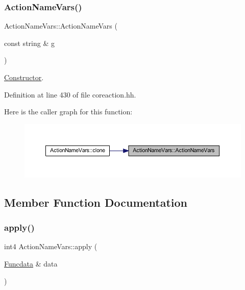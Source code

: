 \subsubsection{\texorpdfstring{ActionNameVars()}{ActionNameVars()}}
{\footnotesize\ttfamily Action\+Name\+Vars\+::\+Action\+Name\+Vars (\begin{DoxyParamCaption}\item[{const string \&}]{g }\end{DoxyParamCaption})\hspace{0.3cm}{\ttfamily [inline]}}



\mbox{\hyperlink{class_constructor}{Constructor}}. 



Definition at line 430 of file coreaction.\+hh.

Here is the caller graph for this function\+:
\nopagebreak
\begin{figure}[H]
\begin{center}
\leavevmode
\includegraphics[width=350pt]{class_action_name_vars_a90f4bef1bf5d7bbc1a1b0399d9c102fe_icgraph}
\end{center}
\end{figure}


\subsection{Member Function Documentation}
\mbox{\label{class_action_name_vars_aac0b5f8eea942d73f9fcdb4fca44f1bd}} 
\subsubsection{\texorpdfstring{apply()}{apply()}}
{\footnotesize\ttfamily int4 Action\+Name\+Vars\+::apply (\begin{DoxyParamCaption}\item[{\mbox{\hyperlink{class_funcdata}{Funcdata}} \&}]{data }\end{DoxyParamCaption})\hspace{0.3cm}{\ttfamily [virtual]}}



